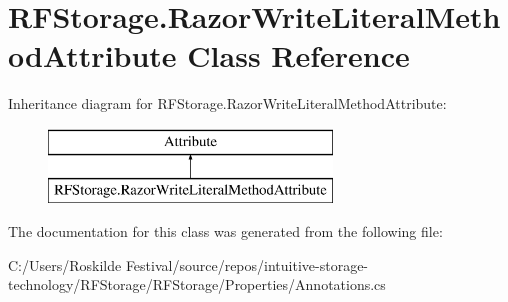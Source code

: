 \hypertarget{class_r_f_storage_1_1_razor_write_literal_method_attribute}{}\section{R\+F\+Storage.\+Razor\+Write\+Literal\+Method\+Attribute Class Reference}
\label{class_r_f_storage_1_1_razor_write_literal_method_attribute}
Inheritance diagram for R\+F\+Storage.\+Razor\+Write\+Literal\+Method\+Attribute\+:\begin{figure}[H]
\begin{center}
\leavevmode
\includegraphics[height=2.000000cm]{class_r_f_storage_1_1_razor_write_literal_method_attribute}
\end{center}
\end{figure}


The documentation for this class was generated from the following file\+:\begin{DoxyCompactItemize}
\item 
C\+:/\+Users/\+Roskilde Festival/source/repos/intuitive-\/storage-\/technology/\+R\+F\+Storage/\+R\+F\+Storage/\+Properties/Annotations.\+cs\end{DoxyCompactItemize}
